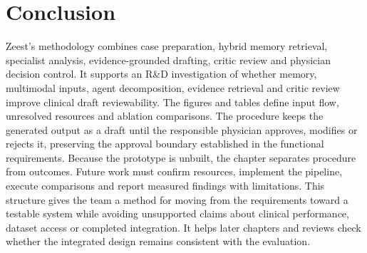 \section{Conclusion}

Zeest's methodology combines case preparation, hybrid memory retrieval, specialist analysis, evidence-grounded drafting, critic review and physician decision control. It supports an R\&D investigation of whether memory, multimodal inputs, agent decomposition, evidence retrieval and critic review improve clinical draft reviewability. The figures and tables define input flow, unresolved resources and ablation comparisons. The procedure keeps the generated output as a draft until the responsible physician approves, modifies or rejects it, preserving the approval boundary established in the functional requirements. Because the prototype is unbuilt, the chapter separates procedure from outcomes. Future work must confirm resources, implement the pipeline, execute comparisons and report measured findings with limitations. This structure gives the team a method for moving from the requirements toward a testable system while avoiding unsupported claims about clinical performance, dataset access or completed integration. It helps later chapters and reviews check whether the integrated design remains consistent with the evaluation.

\endgroup
